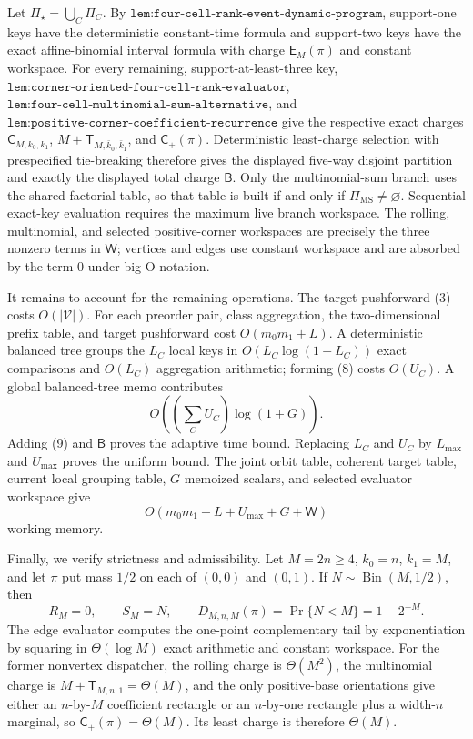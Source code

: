 Let \(\Pi_\star=\bigcup_C\Pi_C\). By \(\texttt{lem:four-cell-rank-event-dynamic-program}\), support-one keys have the deterministic constant-time formula and support-two keys have the exact affine-binomial interval formula with charge \(\mathsf E_M(\pi)\) and constant workspace. For every remaining, support-at-least-three key, \(\texttt{lem:corner-oriented-four-cell-rank-evaluator}\), \(\texttt{lem:four-cell-multinomial-sum-alternative}\), and \(\texttt{lem:positive-corner-coefficient-recurrence}\) give the respective exact charges \(\mathsf C_{M,k_0,k_1}\), \(M+\mathsf T_{M,\bar k_0,\bar k_1}\), and \(\mathsf C_+(\pi)\). Deterministic least-charge selection with prespecified tie-breaking therefore gives the displayed five-way disjoint partition and exactly the displayed total charge \(\mathsf B\). Only the multinomial-sum branch uses the shared factorial table, so that table is built if and only if \(\Pi_{\mathrm{MS}}\ne\varnothing\). Sequential exact-key evaluation requires the maximum live branch workspace. The rolling, multinomial, and selected positive-corner workspaces are precisely the three nonzero terms in \(\mathsf W\); vertices and edges use constant workspace and are absorbed by the term \(0\) under big-O notation.

It remains to account for the remaining operations. The target pushforward (3) costs \(O(|\mathcal V|)\). For each preorder pair, class aggregation, the two-dimensional prefix table, and target pushforward cost \(O(m_0m_1+L)\). A deterministic balanced tree groups the \(L_C\) local keys in \(O(L_C\log(1+L_C))\) exact comparisons and \(O(L_C)\) aggregation arithmetic; forming (8) costs \(O(U_C)\). A global balanced-tree memo contributes
\[
O\!\left(\left(\sum_CU_C\right)\log(1+G)\right).
\tag{9}
\]
Adding (9) and \(\mathsf B\) proves the adaptive time bound. Replacing \(L_C\) and \(U_C\) by \(L_{\max}\) and \(U_{\max}\) proves the uniform bound. The joint orbit table, coherent target table, current local grouping table, \(G\) memoized scalars, and selected evaluator workspace give
\[
O(m_0m_1+L+U_{\max}+G+\mathsf W)
\tag{10}
\]
working memory.

Finally, we verify strictness and admissibility. Let \(M=2n\ge4\), \(k_0=n\), \(k_1=M\), and let \(\pi\) put mass \(1/2\) on each of \((0,0)\) and \((0,1)\). If \(N\sim\operatorname{Bin}(M,1/2)\), then
\[
R_M=0,\qquad S_M=N,\qquad D_{M,n,M}(\pi)=\Pr\{N<M\}=1-2^{-M}.
\tag{11}
\]
The edge evaluator computes the one-point complementary tail by exponentiation by squaring in \(\Theta(\log M)\) exact arithmetic and constant workspace. For the former nonvertex dispatcher, the rolling charge is \(\Theta(M^2)\), the multinomial charge is \(M+\mathsf T_{M,n,1}=\Theta(M)\), and the only positive-base orientations give either an \(n\)-by-\(M\) coefficient rectangle or an \(n\)-by-one rectangle plus a width-\(n\) marginal, so \(\mathsf C_+(\pi)=\Theta(M)\). Its least charge is therefore \(\Theta(M)\).

